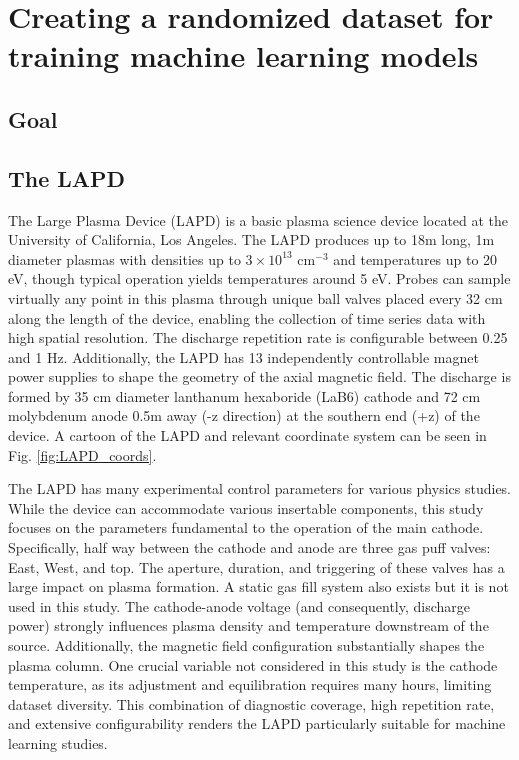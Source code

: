 \graphicspath{{Chapters/Chapter_ml-dataruns/}}

\chapter{Creating a randomized  dataset for training machine learning models}
\label{ch:ml-dataruns}

\section{Goal}

\section{The LAPD}

The Large Plasma Device (LAPD)\cite{gekelman_upgraded_2016,qian_design_2023} is a basic plasma science device located at the University of California, Los Angeles. The LAPD produces up to 18m long, 1m diameter plasmas  with densities up to $3 \times 10^{13}$ cm$^{-3}$ and temperatures up to 20 eV, though typical operation yields temperatures around 5 eV. Probes can sample virtually any point in this plasma through  unique ball valves placed every 32 cm along the length of the device, enabling the collection of time series data with high spatial resolution. The discharge repetition rate is configurable between 0.25 and 1 Hz. Additionally, the LAPD has 13 independently controllable magnet power supplies to shape the geometry of the axial magnetic field. The discharge is formed by 35 cm diameter lanthanum hexaboride (LaB6) cathode\cite{qian_design_2023} and 72 cm molybdenum anode 0.5m away (-z direction) at the southern end (+z) of the device. A cartoon of the LAPD and relevant coordinate system can be seen in Fig. \ref{fig:LAPD_coords}. 



The LAPD has many experimental control parameters for various physics studies. While the device can accommodate various insertable components, this study focuses on the parameters fundamental to the operation of the main cathode. Specifically, half way between the cathode and anode are three gas puff valves: East, West, and top. The aperture, duration, and triggering of these valves has a large impact on plasma formation. A static gas fill system also exists but it is not used in this study. The cathode-anode voltage (and consequently, discharge power) strongly influences plasma density and temperature downstream of the source. Additionally, the magnetic field configuration substantially shapes the plasma column. One crucial variable not considered in this study is the cathode temperature, as its adjustment and equilibration requires many hours, limiting dataset diversity. This combination of diagnostic coverage, high repetition rate, and extensive configurability renders the LAPD particularly suitable for machine learning studies. 

